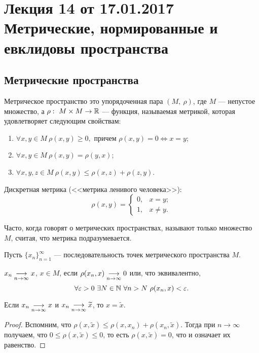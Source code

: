 \documentclass[a4paper, 12pt]{article}
\begin{document}
\pagestyle{fancy}
\section{Лекция 14 от 17.01.2017 \\ Метрические, нормированные и евклидовы пространства}

\subsection*{Метрические пространства}

\begin{Def}
Метрическое пространство это упорядоченная пара $(M,\ \rho)$, где $M$ --- непустое множество, а $\rho:\ M\times M \to \mathbb{R}$ --- функция, называемая метрикой, которая удовлетворяет следующим свойствам:
\begin{enumerate}
\item $\forall x, y \in M\ \rho(x, y) \geq 0,$ причем $\rho(x, y) = 0 \Leftrightarrow x = y$;
\item $\forall x, y \in M\ \rho(x, y) = \rho(y, x)$;
\item $\forall x, y, z \in M\ \rho(x, y) \leq \rho(x, z) + \rho(z, y)$.
\end{enumerate}
\end{Def}

\begin{Examples}
Дискретная метрика (<<метрика ленивого человека>>):
$$
\rho(x, y) = \begin{cases}
0, & x = y;\\
1, & x \neq y.
\end{cases}
$$
\end{Examples}

Часто, когда говорят о метрических пространствах, называют только множество $M$, считая, что метрика подразумевается.

Пусть $\{x_n\}_{n=1}^{\infty}$ --- последовательность точек метрического пространства $M$.
\begin{Def}
$x_n \underset{n\to \infty}{\longrightarrow} x $, $x\in M$, если $\rho(x_n, x) \underset{n\to \infty}{\longrightarrow} 0$ или, что эквивалентно,
$$
\forall \varepsilon > 0\ \exists N \in \mathbb{N}\ \forall n > N\ \rho(x_n, x) < \varepsilon.
$$
\end{Def}

\begin{Statement}
Если $x_n \underset{n\to \infty}{\longrightarrow} x$ и $x_n \underset{n\to \infty}{\longrightarrow} \widetilde{x}$, то $x = \widetilde{x}$.
\end{Statement}
\begin{proof}
Вспомним, что $\rho(x, \widetilde{x}) \leq \rho(x, x_n) + \rho(x_n, \widetilde{x})$. Тогда при $n \to \infty$ получаем, что $0 \leq \rho(x, \widetilde{x}) \leq 0$, то есть $\rho(x, \widetilde{x}) = 0$, что и означает их равенство. 
\end{proof}
\end{document}
